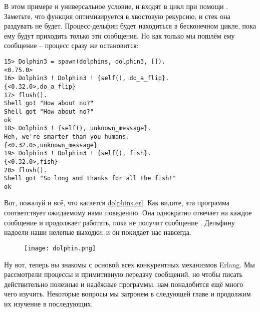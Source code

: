 В этом примере и универсальное условие, и  входят в цикл при помощи .
Заметьте, что функция оптимизируется в хвостовую рекурсию, и стек она раздувать не будет.
Процесс\--дельфин будет находиться в бесконечном цикле, пока ему будут приходить только эти сообщения. 
Но как только мы пошлём ему сообщение \--- процесс сразу же остановится:
\begin{lstlisting}[style=erlang]
15> Dolphin3 = spawn(dolphins, dolphin3, []).
<0.75.0>
16> Dolphin3 ! Dolphin3 ! {self(), do_a_flip}.
{<0.32.0>,do_a_flip}
17> flush().
Shell got "How about no?"
Shell got "How about no?"
ok
18> Dolphin3 ! {self(), unknown_message}.    
Heh, we're smarter than you humans.
{<0.32.0>,unknown_message}
19> Dolphin3 ! Dolphin3 ! {self(), fish}.
{<0.32.0>,fish}
20> flush().
Shell got "So long and thanks for all the fish!"
ok
\end{lstlisting}

Вот, пожалуй и всё, что касается \href{http://learnyousomeerlang.com/static/erlang/dolphins.erl}{dolphins.erl}.
Как видите, эта программа соответствует ожидаемому нами поведению.
Она однократно отвечает на каждое сообщение и продолжает работать, пока не получит сообщение .
Дельфину надоели наши нелепые выходки, и он покидает нас навсегда.
\begin{figure}[h!]
    \centering
    \texttt{[image: dolphin.png]}
\end{figure}

Ну вот, теперь вы знакомы с основой всех конкурентных механизмов Erlang.
Мы рассмотрели процессы и примитивную передачу сообщений, но чтобы писать действительно полезные и надёжные программы, нам понадобится ещё много чего изучить.
Некоторые вопросы мы затронем в следующей главе и продолжим их изучение в последующих.
